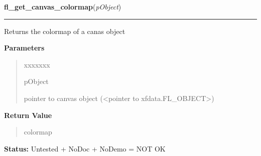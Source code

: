 \hspace{.8\funcindent}\begin{boxedminipage}{\funcwidth}

    \raggedright \textbf{fl\_get\_canvas\_colormap}(\textit{pObject})

    \vspace{-1.5ex}

    \rule{\textwidth}{0.5\fboxrule}
\setlength{\parskip}{2ex}
    Returns the colormap of a canas object

\setlength{\parskip}{1ex}
      \textbf{Parameters}
      \vspace{-1ex}

      \begin{quote}
        \begin{Ventry}{xxxxxxx}

          \item[pObject]

          pointer to canvas object ({\textless}pointer to 
          xfdata.FL\_OBJECT{\textgreater})

        \end{Ventry}

      \end{quote}

      \textbf{Return Value}
    \vspace{-1ex}

      \begin{quote}
      colormap

      \end{quote}

\textbf{Status:} Untested + NoDoc + NoDemo = NOT OK



    \end{boxedminipage}

    \label{xformslib:library:fl_get_canvas_depth}

    \vspace{0.5ex}

